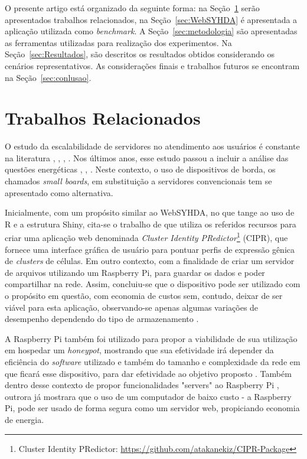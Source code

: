 \documentclass[12pt,english,brazil]{article}
\begin{document}
O presente artigo está organizado da seguinte forma: na Seção~\ref{sec:TrabalhosRelacionados} serão apresentados trabalhos relacionados, na Seção~\ref{sec:WebSYHDA} é apresentada a aplicação utilizada como \emph{benchmark}. A Seção~\ref{sec:metodologia} são apresentadas as ferramentas utilizadas para realização dos experimentos. Na Seção~\ref{sec:Resultados}, são descritos os resultados obtidos considerando os cenários representativos. As considerações finais e trabalhos futuros se encontram na Seção~\ref{sec:conlusao}.

\section{Trabalhos Relacionados} \label{sec:TrabalhosRelacionados}

O estudo da escalabilidade de servidores no atendimento aos usuários é constante na literatura \cite{generic1}, \cite{generic5}, \cite{generic3}, \cite{generic4}. Nos últimos anos, esse estudo passou a incluir a análise das questões
energéticas \cite{generic6}, \cite{generic7}, \cite{generic8}. Neste contexto, o uso de dispositivos de borda, os chamados \emph{small
boards}, em substituição a servidores convencionais tem se apresentado como alternativa.

Inicialmente, com um propósito similar ao WebSYHDA, no que tange ao uso de R e a estrutura Shiny, cita-se o  trabalho de \cite{CIPR} que utiliza os referidos recursos para criar uma aplicação web denominada \emph{Cluster Identity PRedictor}\footnote{Cluster Identity PRedictor: \url{https://github.com/atakanekiz/CIPR-Package}} (CIPR), que fornece uma interface gráfica de usuário para pontuar perfis de expressão gênica de \emph{clusters} de células.
Em outro contexto, com a finalidade de criar um servidor de arquivos utilizando um Raspberry Pi, para guardar os dados e poder compartilhar na rede. Assim, concluiu-se que o dispositivo pode ser utilizado com o propósito em questão, com economia de custos sem, contudo, deixar de ser viável para esta aplicação, observando-se apenas algumas variações de desempenho dependendo do tipo de armazenamento \cite{bruschi2016teste}.

A Raspberry Pi também foi utilizado para propor a viabilidade de sua utilização em hospedar um \emph{honeypot}, mostrando que sua efetividade irá depender da eficiência do \emph{software} utilizado e também do tamanho e complexidade da rede em que ficará esse dispositivo, para dar efetividade ao objetivo proposto \cite{honeypot}. Também dentro desse contexto de propor funcionalidades "servers" ao Raspberry Pi \cite{inproceedings}, outrora já mostrara que o uso de um computador de baixo custo - a Raspberry Pi, pode ser usado de forma segura como um servidor web,  propiciando economia de energia.
\end{document}
